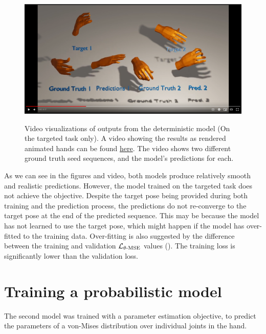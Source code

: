 \begin{figure}
    \centering
    \href{https://www.youtube.com/watch?v=XxVlzT4joAU}{\includegraphics[width=\linewidth]{figures/youtube-thumbnail.png}}
    \captionsetup{parskip=7pt}
    \caption[Video of the deterministic model predictions]{Video visualizations of outputs from the deterministic model (On the targeted task only). A video showing the results as rendered animated hands can be found \href{https://www.youtube.com/watch?v=XxVlzT4joAU}{here}. The video shows two different ground truth seed sequences, and the model's predictions for each.}
    \label{fig:mean-video}
\end{figure}

\clearpage

As we can see in the figures and video, both models produce relatively smooth and realistic predictions. However, the model trained on the targeted task does not achieve the objective. Despite the target pose being provided during both training and the prediction process, the predictions do not re-converge to the target pose at the end of the predicted sequence. This may be because the model has not learned to use the target pose, which might happen if the model has over-fitted to the training data. Over-fitting is also suggested by the difference between the training and validation $\mathcal{L}_{\theta\text{-MSE}}$ values (). The training loss is significantly lower than the validation loss.

\section{Training a probabilistic model}
\label{S:prob-model}

The second model was trained with a parameter estimation objective, to predict the parameters of a von-Mises distribution over individual joints in the hand.

